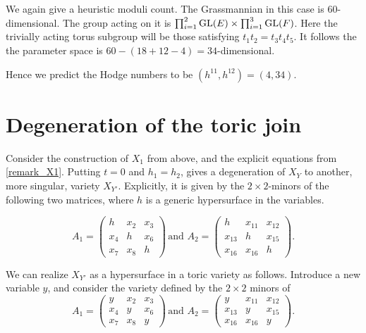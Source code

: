 \begin{remark}
We again give a heuristic moduli count. The Grassmannian in this case is $60$-dimensional. The group acting on it is $\prod^2_{i=1} \operatorname{GL}(E) \times \prod^3_{i=1} \operatorname{GL}(F)$. Here the trivially acting torus subgroup will be those satisfying $t_1t_2=t_3t_4t_5$. It follows the the parameter space is $60-(18+12-4)=34$-dimensional.

Hence we predict the Hodge numbers to be $(h^{11},h^{12})=(4,34)$.
\end{remark}



\section{Degeneration of the toric join}
\label{sec:degenjoin}

Consider the construction of $X_1$ from above, and the explicit equations from \cref{remark_X1}. Putting $t=0$ and $h_1=h_2$, gives a degeneration of $X_Y$ to another, more singular, variety $X_{Y'}$. Explicitly, it is given by the $2 \times 2$-minors of the following two matrices, where $h$ is a generic hypersurface in the variables.

\[
A_1 = \begin{pmatrix}
h   & x_2 & x_3 \\
x_4 & h  & x_6 \\
x_7 & x_8 & h
\end{pmatrix}\,
\text{and }
A_2 = \begin{pmatrix}
h & x_{11} & x_{12} \\
x_{13} & h & x_{15} \\
x_{16} & x_{16} & h
\end{pmatrix}.
\]

We can realize $X_{Y'}$ as a hypersurface in a toric variety as follows. Introduce a new variable $y$, and consider the  variety defined by the $2 \times 2$ minors of
\[
A_1 = \begin{pmatrix}
y   & x_2 & x_3 \\
x_4 & y  & x_6 \\
x_7 & x_8 & y
\end{pmatrix}\,
\text{and }
A_2 = \begin{pmatrix}
y & x_{11} & x_{12} \\
x_{13} & y & x_{15} \\
x_{16} & x_{16} & y
\end{pmatrix}.
\]

